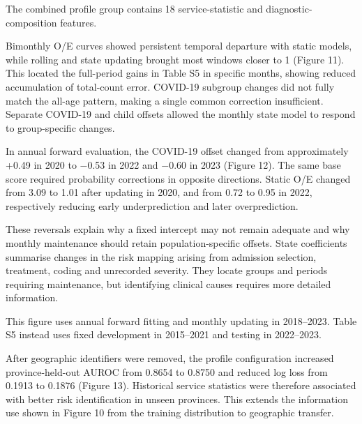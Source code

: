 \documentclass[11pt,a4paper]{article}
\newcommand{\subheading}[1]{\par\needspace{3\baselineskip}\vspace{5pt}{\bfseries #1}\par\vspace{1pt}}
\begin{document}
{\small The combined profile group contains 18 service-statistic and diagnostic-composition features.\par}
\subheading{Figure 11. Bimonthly observed-to-expected mortality in 2022–2023 under static prediction, rolling windows and state-space recalibration.}
Bimonthly O/E curves showed persistent temporal departure with static models, while rolling and state updating brought most windows closer to 1 (Figure 11). This located the full-period gains in Table S5 in specific months, showing reduced accumulation of total-count error. COVID-19 subgroup changes did not fully match the all-age pattern, making a single common correction insufficient. Separate COVID-19 and child offsets allowed the monthly state model to respond to group-specific changes.

\subheading{Figure 12. State-space recalibration in 2018–2023 using annual forward prediction from models fitted on preceding years. (A–D) Coefficients and 95\% interval bands. (E) O/E. (F) Configuration selection in development years.}
In annual forward evaluation, the COVID-19 offset changed from approximately +0.49 in 2020 to $-$0.53 in 2022 and $-$0.60 in 2023 (Figure 12). The same base score required probability corrections in opposite directions. Static O/E changed from 3.09 to 1.01 after updating in 2020, and from 0.72 to 0.95 in 2022, respectively reducing early underprediction and later overprediction.

These reversals explain why a fixed intercept may not remain adequate and why monthly maintenance should retain population-specific offsets. State coefficients summarise changes in the risk mapping arising from admission selection, treatment, coding and unrecorded severity. They locate groups and periods requiring maintenance, but identifying clinical causes requires more detailed information.

{\small This figure uses annual forward fitting and monthly updating in 2018–2023. Table S5 instead uses fixed development in 2015–2021 and testing in 2022–2023.\par}
\subheading{Figure 13. Transfer to unseen provinces with and without facility profiles.}
After geographic identifiers were removed, the profile configuration increased province-held-out AUROC from 0.8654 to 0.8750 and reduced log loss from 0.1913 to 0.1876 (Figure 13). Historical service statistics were therefore associated with better risk identification in unseen provinces. This extends the information use shown in Figure 10 from the training distribution to geographic transfer.
\end{document}
